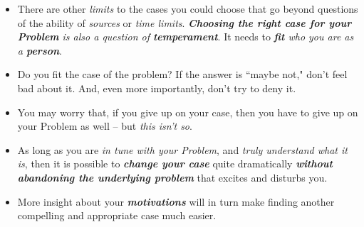 \documentclass[11pt]{article}
\begin{document}
\begin{itemize}
\begin{itemize}
\begin{itemize}
\item There are other \emph{limits} to the cases you could choose that go beyond questions of the ability of \emph{sources} or \emph{time limits}. \emph{\textbf{Choosing the right case for your Problem} is also a question of \textbf{temperament}}. It needs to \emph{\textbf{fit} who you are as a \textbf{person}}. 

\item Do you fit the case of the problem? If the answer is ``maybe not," don’t feel bad about it. And, even more importantly, don’t try to deny it.

\item You may worry that, if you give up on your case, then you have to give up on your Problem as well -- but \emph{this isn’t so}.

\item As long as you are \emph{in tune with your Problem}, and \emph{truly understand what it is}, then it is possible to \emph{\textbf{change your case}} quite dramatically \emph{\textbf{without abandoning the underlying problem}} that excites and disturbs you. 

\item More insight about your \emph{\textbf{motivations}} will in turn make finding another compelling and appropriate case much easier.
\end{itemize}
\end{itemize}
\end{itemize}
\end{document}
